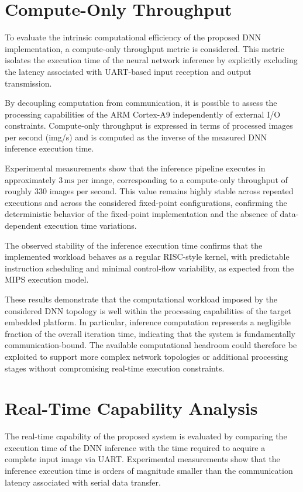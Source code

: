 \section{Compute-Only Throughput}

To evaluate the intrinsic computational efficiency of the proposed DNN
implementation, a compute-only throughput metric is considered.
This metric isolates the execution time of the neural network inference by
explicitly excluding the latency associated with UART-based input reception and
output transmission.

By decoupling computation from communication, it is possible to assess the
processing capabilities of the ARM Cortex-A9 independently of external I/O
constraints.
Compute-only throughput is expressed in terms of processed images per second
(img/s) and is computed as the inverse of the measured DNN inference execution
time.

Experimental measurements show that the inference pipeline executes in
approximately $3\,\mathrm{ms}$ per image, corresponding to a compute-only
throughput of roughly $330$ images per second.
This value remains highly stable across repeated executions and across the
considered fixed-point configurations, confirming the deterministic behavior of
the fixed-point implementation and the absence of data-dependent execution time
variations.

The observed stability of the inference execution time confirms that the
implemented workload behaves as a regular RISC-style kernel, with predictable
instruction scheduling and minimal control-flow variability, as expected from
the MIPS execution model.


These results demonstrate that the computational workload imposed by the
considered DNN topology is well within the processing capabilities of the target
embedded platform.
In particular, inference computation represents a negligible fraction of the
overall iteration time, indicating that the system is fundamentally
communication-bound.
The available computational headroom could therefore be exploited to support
more complex network topologies or additional processing stages without
compromising real-time execution constraints.

\section{Real-Time Capability Analysis}

The real-time capability of the proposed system is evaluated by comparing the
execution time of the DNN inference with the time required to acquire a complete
input image via UART.
Experimental measurements show that the inference execution time is orders of
magnitude smaller than the communication latency associated with serial data
transfer.

